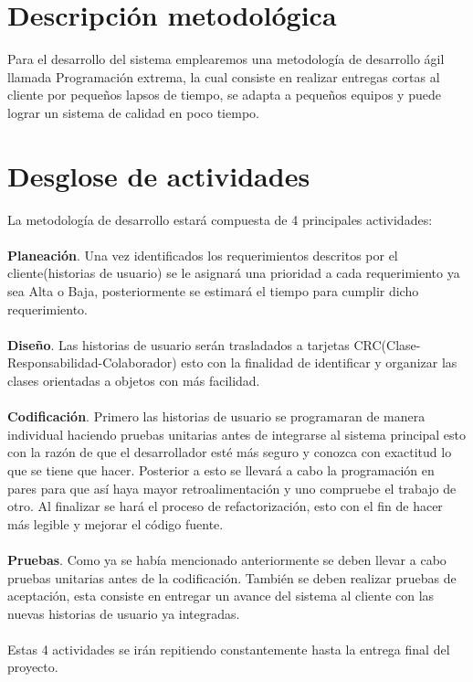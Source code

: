 \section{Descripción metodológica}
Para el desarrollo del sistema emplearemos una metodología de desarrollo ágil llamada Programación extrema, la cual consiste en realizar entregas cortas al cliente por pequeños lapsos de tiempo, se adapta a pequeños equipos y puede lograr un sistema de calidad en poco tiempo.



\section{Desglose de actividades}

La metodología de desarrollo estará compuesta de 4 principales actividades:
\\\\
\textbf{Planeación}. Una vez identificados los requerimientos descritos por el cliente(historias de usuario) se le asignará una prioridad a cada requerimiento ya sea Alta o Baja, posteriormente se estimará el tiempo para cumplir dicho requerimiento.
\\\\
\textbf{Diseño}. Las historias de usuario serán trasladados a tarjetas CRC(Clase-Responsabilidad-Colaborador) esto con la finalidad de identificar y organizar las clases orientadas a objetos con más facilidad.
\\\\
\textbf{Codificación}. Primero las historias de usuario se programaran de manera individual haciendo pruebas unitarias antes de integrarse al sistema principal esto con la razón de que el desarrollador esté más seguro y conozca con exactitud lo que se tiene que hacer. Posterior a esto se llevará a cabo la programación en pares para que así haya mayor retroalimentación y uno compruebe el trabajo de otro. Al finalizar se hará el proceso de refactorización, esto con el fin de hacer más legible y mejorar el código fuente.
\\\\
\textbf{Pruebas}. Como ya se había mencionado anteriormente se deben llevar a cabo pruebas unitarias antes de la codificación. También se deben realizar pruebas de aceptación, esta consiste en entregar un avance del sistema al cliente con las nuevas historias de usuario  ya integradas.
\\\\
Estas 4 actividades se irán repitiendo constantemente hasta la entrega final del proyecto.

